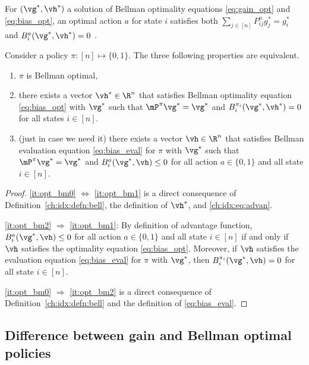 For $(\vg^*,\vh^*)$ a solution of Bellman optimality equations \eqref{eq:gain_opt} and \eqref{eq:bias_opt},
an optimal action $a$ for state $i$ satisfies both $\sum_{j\in[n]}P^a_{ij}g^*_j =g^*_i$ and $B^a_i(\vg^*,\vh^*)=0$ \cite{puterman2014markov, schweitzer1978functional}.
\begin{lem}
    \label{ch:idx:lem:bell_charac}
    Consider a policy $\pi:[n]\mapsto\{0,1\}$.
    The three following properties are equivalent.
    \begin{enumerate}[label=(\roman*)]
        \item \label{it:opt_bm0} $\pi$ is Bellman optimal,
        \item \label{it:opt_bm1} there exists a vector $\vh^*\in\R^{n}$ that satisfies Bellman optimality equation \eqref{eq:bias_opt} with $\vg^*$ such that $\mP^\pi\vg^*=\vg^*$ and $B^{\pi_i}_i(\vg^*,\vh^*)=0$ for all states $i\in[n]$.
        \item \label{it:opt_bm2} (just in case we need it) there exists a vector $\vh\in\R^{n}$ that satisfies Bellman evaluation equation \eqref{eq:bias_eval} for $\pi$ with $\vg^*$ such that $\mP^\pi\vg^*=\vg^*$ and $B^a_i(\vg^*,\vh)\le0$ for all action $a\in\{0,1\}$ and all state $i\in[n]$.
        \end{enumerate}
\end{lem}
\begin{proof}
    \ref{it:opt_bm0} $\Leftrightarrow$ \ref{it:opt_bm1} is a direct consequence of Definition~\ref{ch:idx:defn:bell}, the definition of $\vh^*$, and \eqref{ch:idx:eq:advan}.

    \ref{it:opt_bm2} $\Rightarrow$ \ref{it:opt_bm1}: By definition of advantage function, $B^a_i(\vg^*,\vh)\le0$ for all action $a\in\{0,1\}$ and all state $i\in[n]$ if and only if $\vh$ satisfies the optimality equation \eqref{eq:bias_opt}.
    Moreover, if $\vh$ satisfies the evaluation equation \eqref{eq:bias_eval} for $\pi$ with $\vg^*$, then $B^{\pi_i}_i(\vg^*,\vh)=0$ for all state $i\in[n]$.

    \ref{it:opt_bm0} $\Rightarrow$ \ref{it:opt_bm2} is a direct consequence of Definition~\ref{ch:idx:defn:bell} and the definition of \eqref{eq:bias_eval}.
\end{proof}

\subsection{Difference between gain and Bellman optimal policies}
\label{ch:idx:ssec:gain_bell}


